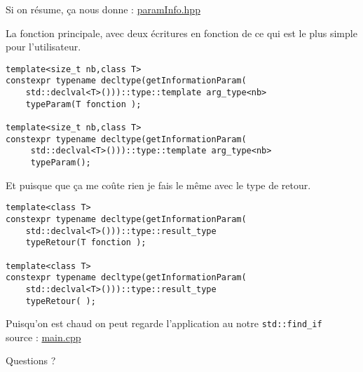 \documentclass{beamer}
\begin{document}
\begin{frame}
Si on résume, ça nous donne : 
	\href{run:../code/src/paramInfo.hpp}{paramInfo.hpp}\\


\end{frame}

%

\begin{frame}[containsverbatim]
La fonction principale, avec deux écritures en fonction de ce qui est le plus simple pour l'utilisateur. 
\begin{lstlisting}
template<size_t nb,class T>
constexpr typename decltype(getInformationParam(
    std::declval<T>()))::type::template arg_type<nb>
    typeParam(T fonction );

template<size_t nb,class T>
constexpr typename decltype(getInformationParam(
     std::declval<T>()))::type::template arg_type<nb>
     typeParam();
\end{lstlisting}

\end{frame} 


\begin{frame}[containsverbatim]
Et puisque que ça me coûte rien je fais le même avec le type de retour.  
\begin{lstlisting}
template<class T>
constexpr typename decltype(getInformationParam(
    std::declval<T>()))::type::result_type 
    typeRetour(T fonction );

template<class T>
constexpr typename decltype(getInformationParam(
    std::declval<T>()))::type::result_type 
    typeRetour( );
\end{lstlisting}

\end{frame} 

\begin{frame}
Puisqu'on est chaud on peut regarde l'application au notre \lstinline{std::find_if} \\ source : \href{run:../code/src/main.cpp}{main.cpp}\\


\end{frame}

\begin{frame}
    \begin{center}
        \Huge Questions ? 
    \end{center}
\end{frame}
\end{document}
